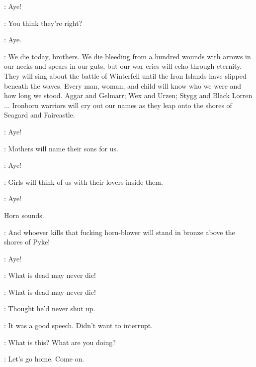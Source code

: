 \IRONBORN: Aye! 

\THEON: You think they're right? 

\IRONBORN: Aye. 

\THEON: We die today, brothers. We die bleeding from a hundred wounds with arrows in our necks and spears in our guts, but our war cries will echo through eternity. They will sing about the battle of Winterfell until the Iron Islands have slipped beneath the waves. Every man, woman, and child will know who we were and how long we stood. Aggar and Gelmarr; Wex and Urzen; Stygg and Black Lorren $\ldots$  Ironborn warriors will cry out our names as they leap onto the shores of Seagard and Faircastle. 


\IRONBORN: Aye! 

\THEON: Mothers will name their sons for us. 

\IRONBORN: Aye! 

\THEON: Girls will think of us with their lovers inside them. 

\IRONBORN: Aye! 

\sfx Horn sounds.

\THEON: And whoever kills that fucking horn-blower will stand in bronze above the shores of Pyke! 

\IRONBORN: Aye! 

\THEON: What is dead may never die! 

\IRONBORN: What is dead may never die! 



\LORREN: Thought he'd never shut up. 

\DAGMER: It was a good speech. Didn't want to interrupt. 


\LUWIN: What is this? What are you doing? 


\DAGMER:  Let's go home. Come on. 



\scene

